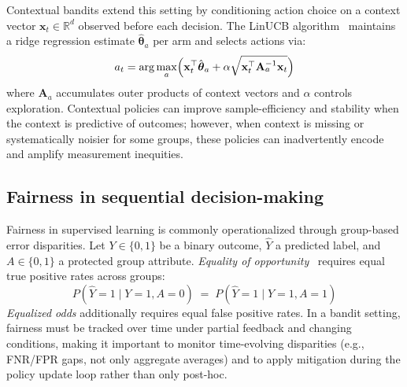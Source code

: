 \documentclass[conference]{IEEEtran}
\begin{document}
Contextual bandits extend this setting by conditioning action choice on a context vector
$\mathbf{x}_t \in \mathbb{R}^d$ observed before each decision. The LinUCB
algorithm~\cite{li2010contextual} maintains a ridge regression estimate
$\hat{\boldsymbol{\theta}}_a$ per arm and selects actions via:
\begin{equation}
a_t = \arg\max_{a} \Bigl(
  \mathbf{x}_t^\top \hat{\boldsymbol{\theta}}_a
  + \alpha \sqrt{\mathbf{x}_t^\top \mathbf{A}_a^{-1} \mathbf{x}_t}
\Bigr)
\label{eq:linucb}
\end{equation}
where $\mathbf{A}_a$ accumulates outer products of context vectors and $\alpha$ controls
exploration. Contextual policies can improve sample-efficiency and stability when the context
is predictive of outcomes; however, when context is missing or systematically noisier for
some groups, these policies can inadvertently encode and amplify measurement inequities.

\subsection{Fairness in sequential decision-making}
Fairness in supervised learning is commonly operationalized through group-based error
disparities. Let $Y \in \{0,1\}$ be a binary outcome, $\hat{Y}$ a predicted label, and
$A \in \{0,1\}$ a protected group attribute. \emph{Equality of opportunity}~\cite{hardt2016equality}
requires equal true positive rates across groups:
\begin{equation}
P(\hat{Y}=1 \mid Y=1, A=0) \;=\; P(\hat{Y}=1 \mid Y=1, A=1)
\label{eq:eqopp}
\end{equation}
\emph{Equalized odds} additionally requires equal false positive rates. In a bandit setting,
fairness must be tracked over time under partial feedback and changing conditions, making it
important to monitor time-evolving disparities (e.g., FNR/FPR gaps, not only aggregate averages)
and to apply
mitigation during the policy update loop rather than only post-hoc.
\end{document}
